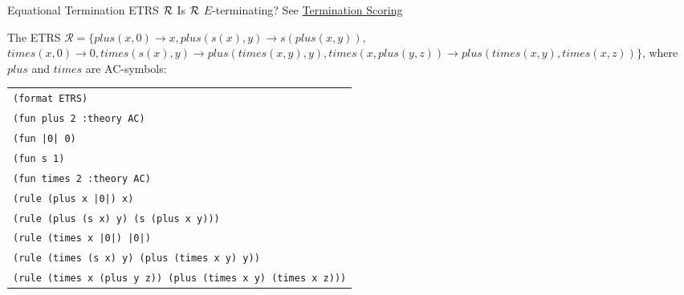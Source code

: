 \begin{formalproblem}
  {Equational Termination}
  {ETRS $\mathcal{R}$}
  {Is ${\cal R}$ $E$-terminating?}
  {See \hyperref[scoring_termination]{Termination Scoring}}
\end{formalproblem}

\begin{example}
The ETRS $\mathcal{R} = \{plus(x,0) \rightarrow x, plus(s(x), y) \rightarrow s(plus(x,y)),$ $times(x,0) \rightarrow 0, times(s(x),y) \rightarrow plus(times(x,y),y), times(x,plus(y,z)) \rightarrow plus(times(x,y),times(x,z))\}$, where $plus$ and $times$ are AC-symbols:

\begin{center}
\begin{tabular}{l}
\texttt{(format ETRS)} \\
\texttt{(fun plus 2 :theory AC)} \\
\texttt{(fun |0| 0)} \\
\texttt{(fun s 1)} \\
\texttt{(fun times 2 :theory AC)} \\
\texttt{(rule (plus x |0|) x)} \\
\texttt{(rule (plus (s x) y) (s (plus x y)))} \\
\texttt{(rule (times x |0|) |0|)}\\
\texttt{(rule (times (s x) y) (plus (times x y) y))}\\
\texttt{(rule (times x (plus y z)) (plus (times x y) (times x z)))}
\end{tabular}
\end{center}
\end{example}



